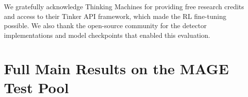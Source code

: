 \documentclass[11pt]{article}
\begin{document}
We gratefully acknowledge Thinking Machines for providing free research credits and access to their Tinker API framework, which made the RL fine-tuning possible. We also thank the open-source community for the detector implementations and model checkpoints that enabled this evaluation.




\appendix

\section{Full Main Results on the MAGE Test Pool}
\label{app:mainresults}

\begin{table}[H]
\centering
\small
\setlength{\tabcolsep}{4pt}
\resizebox{0.78\textwidth}{!}{%
  
}
\caption{Main results on the full filtered MAGE test pool at the 1\% FPR operating point, part I. Lower TPR@1\%FPR/AUROC is better for the attacker; higher ASR is better. This panel reports Binoculars, Fast-DetectGPT, and MAGE. Bold indicates the best value per metric.}
\label{tab:app_main_part1}
\end{table}

\begin{table}[H]
\centering
\small
\setlength{\tabcolsep}{4pt}
\resizebox{0.9\textwidth}{!}{%
  
}
\caption{Main results on the full filtered MAGE test pool at the 1\% FPR operating point, part II. Lower TPR@1\%FPR/AUROC is better for the attacker; higher ASR is better. This panel reports RoBERTa and the mean TPR@1\%FPR / mean ASR aggregates across the four-detector panel. Bold indicates the best value per metric.}
\label{tab:app_main_part2}
\end{table}

\begin{table}[H]
\centering
\small
\setlength{\tabcolsep}{5pt}
\resizebox{0.78\textwidth}{!}{%
  
}
\caption{Supplementary TPR@5\%FPR results on the full filtered MAGE test pool. Lower is better for the attacker. Thresholds are recalibrated on the 15,310 human evaluation samples at the 5\% false-positive operating point. Bold indicates the lowest TPR@5\%FPR per column.}
\label{tab:app_tpr5}
\end{table}
\end{document}
